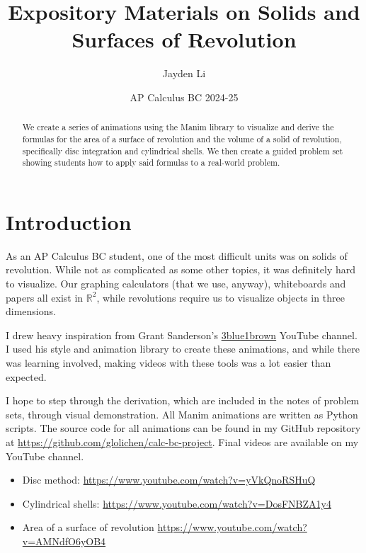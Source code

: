 \documentclass{article}
\title{\vspace*{-40pt} Expository Materials on Solids and Surfaces of Revolution}
\author{Jayden Li}
\date{AP Calculus BC 2024-25}
\begin{document}
\fontsize{11pt}{12pt}\selectfont
\setlength{\abovedisplayskip}{\abovedisplayskip/2}
\setlength{\belowdisplayskip}{\belowdisplayskip/2}
\setlength{\parindent}{0pt}
\setlength{\parskip}{2ex plus 0.5ex minus 0.2ex}
\maketitle

\begin{abstract}
	We create a series of animations using the Manim library to visualize and derive the formulas for the area of a surface of revolution and the volume of a solid of revolution, specifically disc integration and cylindrical shells. We then create a guided problem set showing students how to apply said formulas to a real-world problem.
\end{abstract}

\section{Introduction}

As an AP Calculus BC student, one of the most difficult units was on solids of revolution. While not as complicated as some other topics, it was definitely hard to visualize. Our graphing calculators (that we use, anyway), whiteboards and papers all exist in $\mathbb R^2$, while revolutions require us to visualize objects in three dimensions.

I drew heavy inspiration from Grant Sanderson's \href{https://www.youtube.com/c/3blue1brown}{3blue1brown} YouTube channel. I used his style and animation library to create these animations, and while there was learning involved, making videos with these tools was a lot easier than expected.

I hope to step through the derivation, which are included in the notes of problem sets, through visual demonstration. All Manim animations are written as Python scripts. The source code for all animations can be found in my GitHub repository at \url{https://github.com/glolichen/calc-bc-project}. Final videos are available on my YouTube channel.
\begin{itemize}[topsep=0pt]
	\item Disc method: \url{https://www.youtube.com/watch?v=yVkQnoRSHuQ}
	\item Cylindrical shells: \url{https://www.youtube.com/watch?v=DosFNBZA1y4}
	\item Area of a surface of revolution \url{https://www.youtube.com/watch?v=AMNdfO6yOB4}
\end{itemize}
\end{document}
